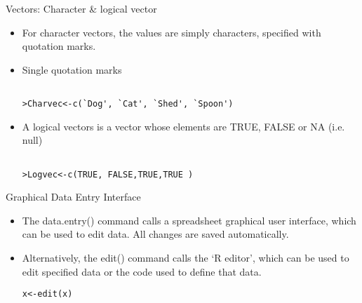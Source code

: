 \documentclass{beamer}
\begin{document}
\begin{frame}[fragile]{Vectors: Character \& logical vector}

\begin{itemize}
\item For character vectors, the values are simply characters,
specified with quotation marks.
\item Single quotation marks
\begin{verbatim}

>Charvec<-c(`Dog', `Cat', `Shed', `Spoon')

\end{verbatim}

\item A logical vectors is a vector whose elements are TRUE, FALSE
or NA (i.e. null)
\begin{verbatim}

>Logvec<-c(TRUE, FALSE,TRUE,TRUE )

\end{verbatim}

\end{itemize}
\end{frame}
\begin{frame}[fragile]{Graphical Data Entry Interface}
\begin{itemize}

\item The data.entry() command calls a spreadsheet graphical user
interface, which can be used to edit data. All changes are saved
automatically.




\item Alternatively, the edit() command calls the `R editor',
which can be used to edit specified data or the code used to
define that data.

\begin{verbatim}
x<-edit(x)
\end{verbatim}

\end{itemize}
\end{frame}


\end{document}
